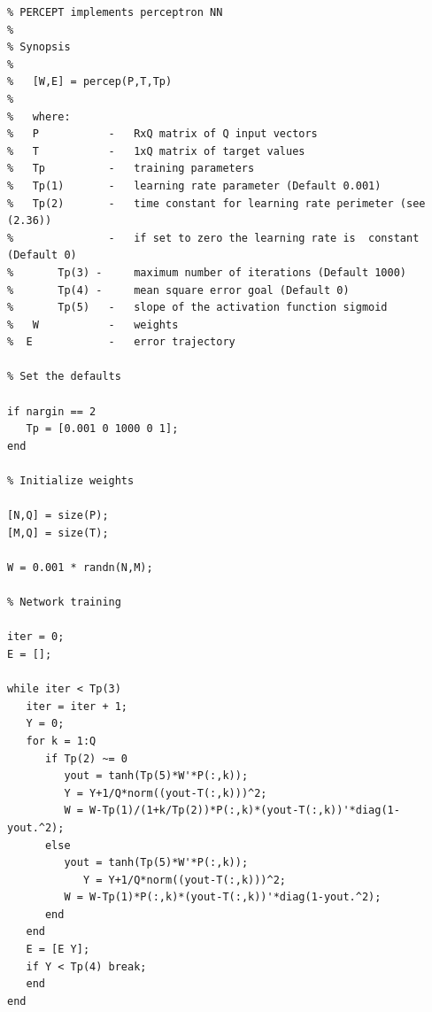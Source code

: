 \documentclass[10pt]{article}
\begin{document}
\begin{enumerate}
\begin{small}
\begin{verbatim}
% PERCEPT implements perceptron NN
%
% Synopsis
%
%	[W,E] = percep(P,T,Tp)
%
% 	where:
% 	P			- 	RxQ matrix of Q input vectors
%	T			- 	1xQ matrix of target values
%	Tp			- 	training parameters
%	Tp(1)		- 	learning rate parameter (Default 0.001)
%	Tp(2)		- 	time constant for learning rate perimeter (see (2.36))
%				- 	if set to zero the learning rate is  constant (Default 0)
%		Tp(3) - 	maximum number of iterations (Default 1000)
%		Tp(4) - 	mean square error goal (Default 0)
%		Tp(5)	- 	slope of the activation function sigmoid
%	W			- 	weights 
%  E			- 	error trajectory

% Set the defaults

if nargin == 2
   Tp = [0.001 0 1000 0 1];
end

% Initialize weights

[N,Q] = size(P);
[M,Q] = size(T);

W = 0.001 * randn(N,M);

% Network training

iter = 0;
E = [];

while iter < Tp(3)
   iter = iter + 1;
   Y = 0;
   for k = 1:Q
      if Tp(2) ~= 0
         yout = tanh(Tp(5)*W'*P(:,k));
         Y = Y+1/Q*norm((yout-T(:,k)))^2;
         W = W-Tp(1)/(1+k/Tp(2))*P(:,k)*(yout-T(:,k))'*diag(1-yout.^2);
      else 
         yout = tanh(Tp(5)*W'*P(:,k));
			Y = Y+1/Q*norm((yout-T(:,k)))^2;
         W = W-Tp(1)*P(:,k)*(yout-T(:,k))'*diag(1-yout.^2);
      end
   end
   E = [E Y];
   if Y < Tp(4) break;
   end
end

\end{verbatim}
\end{small}

\end{enumerate}

\vspace{12mm}
\end{document}
